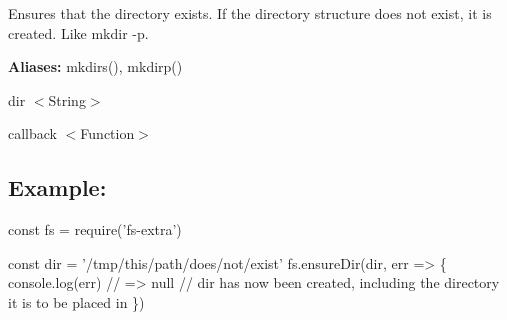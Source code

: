 Ensures that the directory exists. If the directory structure does not exist, it is created. Like {\ttfamily mkdir -\/p}.

{\bfseries Aliases\+:} {\ttfamily mkdirs()}, {\ttfamily mkdirp()}


\begin{DoxyItemize}
\item {\ttfamily dir} {\ttfamily $<$String$>$}
\item {\ttfamily callback} {\ttfamily $<$Function$>$}
\end{DoxyItemize}

\subsection*{Example\+:}


\begin{DoxyCode}
const fs = require('fs-extra')

const dir = '/tmp/this/path/does/not/exist'
fs.ensureDir(dir, err => \{
  console.log(err) // => null
  // dir has now been created, including the directory it is to be placed in
\})
\end{DoxyCode}
 